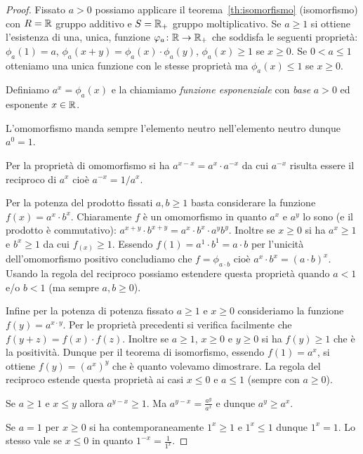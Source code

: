 \begin{proof}
Fissato $a>0$ possiamo applicare il teorema~\ref{th:isomorfismo} (isomorfismo)
con $R={\mathbb R}$ gruppo additivo e $S={\mathbb R}_+$ gruppo moltiplicativo.
Se $a\ge 1$ si ottiene l'esistenza di una, unica, funzione $\varphi_a\colon {\mathbb R} \to {\mathbb R}_+$ 
che soddisfa le seguenti proprietà:
$\phi_a(1)=a$, $\phi_a(x+y) = \phi_a(x)\cdot \phi_a(y)$, 
$\phi_a(x)\ge 1$ se $x\ge 0$. 
Se $0<a\le 1$ otteniamo una unica funzione con le stesse proprietà 
ma $\phi_a(x) \le 1$ se $x\ge 0$.

Definiamo $a^x = \phi_a(x)$ e la chiamiamo \emph{funzione esponenziale}
con \emph{base} $a>0$ ed esponente $x\in {\mathbb R}$.
  
L'omomorfismo manda sempre l'elemento neutro nell'elemento 
neutro dunque $a^0 = 1$.

Per la proprietà di omomorfismo si ha $a^{x-x} = a^x \cdot a^{-x}$
da cui $a^{-x}$ risulta essere il reciproco di $a^x$ cioè 
$a^{-x}= 1/a^x$.

Per la potenza del prodotto fissati $a,b\ge 1$ basta considerare la 
funzione $f(x) = a^x\cdot b^x$. 
Chiaramente $f$ è un omomorfismo in quanto $a^x$ e $a^y$ lo sono 
(e il prodotto è commutativo): 
$a^{x+y}\cdot b^{x+y} = a^x \cdot b^x\cdot a^yb^y$.
Inoltre se $x\ge 0$ si ha $a^x\ge1$ e $b^x\ge 1$ da cui $f_(x)\ge 1$.
Essendo $f(1) = a^1\cdot b^1 = a\cdot b$ 
per l'unicità dell'omomorfismo positivo concludiamo che $f = \phi_{a\cdot b}$
cioè $a^x\cdot b^x = (a\cdot b)^x$.
Usando la regola del reciproco possiamo estendere questa proprietà 
quando $a<1$ e/o $b<1$ (ma sempre $a,b\ge 0$).

Infine per la potenza di potenza fissato $a\ge 1$ e $x\ge 0$ 
consideriamo la funzione $f(y) = a^{x\cdot y}$.
Per le proprietà precedenti si verifica facilmente che  
$f(y+z) = f(x)\cdot f(z)$. 
Inoltre se $a\ge 1$, $x\ge 0$ e $y\ge 0$ si ha 
$f(y)\ge 1$ che è la positività. 
Dunque per il teorema di isomorfismo,
essendo $f(1)=a^x$, si ottiene $f(y) = (a^x)^y$
che è quanto volevamo dimostrare.
La regola del reciproco estende questa proprietà 
ai casi $x\le 0$ e $a\le 1$ (sempre con $a\ge 0$).

Se $a\ge 1$ e $x\le y$ allora $a^{y-x}\ge 1$.
Ma $a^{y-x} = \frac{a^y}{a^x}$ e dunque $a^y\ge a^x$.

Se $a=1$ per $x\ge 0$ si ha contemporaneamente $1^x\ge 1$ e $1^x\le 1$
dunque $1^x=1$. 
Lo stesso vale se $x\le 0$ in quanto $1^{-x}=\frac 1{1^x}$.
\end{proof}

